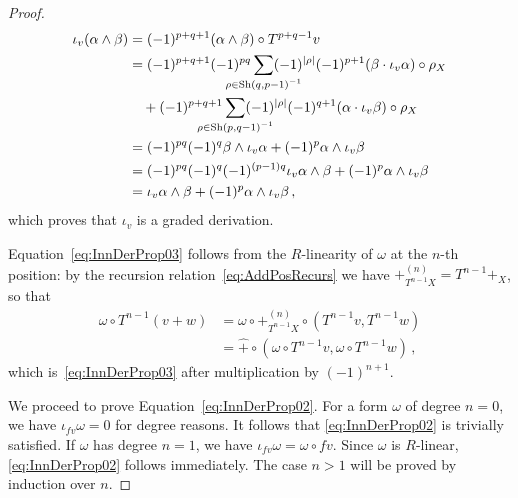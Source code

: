 \documentclass[12pt,reqno, a4paper]{amsart}
\numberwithin{equation}{section}
\theoremstyle{plain}
\theoremstyle{definition}
\theoremstyle{remark}
\DeclareMathOperator{\Shuff}{Sh}
\newcommand{\Radd}{\hat{+}}
\begin{document}
\begin{proof}
\begin{equation*}
\begin{split}
  \iota_v (\alpha \wedge \beta)
  &=
  (-1)^{p+q+1} (\alpha \wedge \beta) \circ T^{p+q-1}v
  \\
  &=
  (-1)^{p+q+1}(-1)^{pq}
  \sum_{\mathclap{\rho \in \Shuff(q,p-1)^{-1}}}
  (-1)^{|\rho|} (-1)^{p+1} (\beta \cdot \iota_v \alpha) \circ \rho_X
  \\
  &\quad{}
  +
  (-1)^{p+q+1}
  \sum_{\mathclap{\rho \in \Shuff(p,q-1)^{-1}}}
  (-1)^{|\rho|} (-1)^{q+1} (\alpha \cdot \iota_v \beta) \circ \rho_X
  \\
  &=
  (-1)^{pq} (-1)^q \beta \wedge \iota_v \alpha
  +
  (-1)^p \alpha \wedge \iota_v \beta
  \\
  &=
  (-1)^{pq} (-1)^q (-1)^{(p-1)q} \iota_v \alpha \wedge \beta
  +
  (-1)^p \alpha \wedge \iota_v \beta
  \\
  &=
  \iota_v \alpha \wedge \beta
  + (-1)^p \alpha \wedge \iota_v \beta
  \,,
\end{split}
\end{equation*}
which proves that $\iota_v$ is a graded derivation.

Equation~\eqref{eq:InnDerProp03} follows from the $R$-linearity of $\omega$ at the $n$-th position: by the recursion relation~\eqref{eq:AddPosRecurs} we have $+^{(n)}_{T^{n-1}X} = T^{n-1}{+_X}$, so that
\begin{equation*}
\begin{split}
  \omega \circ T^{n-1}(v+w)
  &= \omega \circ {+^{(n)}_{T^{n-1}X}} \circ (T^{n-1}v, T^{n-1}w)
  \\
  &= \Radd \circ (\omega \circ T^{n-1}v, \omega \circ T^{n-1}w)
  \,,
\end{split}
\end{equation*}
which is~\eqref{eq:InnDerProp03} after multiplication by $(-1)^{n+1}$.

We proceed to prove Equation~\eqref{eq:InnDerProp02}. For a form $\omega$ of degree $n=0$, we have $\iota_{fv} \omega = 0$ for degree reasons. It follows that \eqref{eq:InnDerProp02} is trivially satisfied. If $\omega$ has degree $n=1$, we have $\iota_{fv} \omega = \omega \circ fv$. Since $\omega$ is $R$-linear, \eqref{eq:InnDerProp02} follows immediately. The case $n > 1$ will be proved by induction over $n$.


\end{proof}
\end{document}
